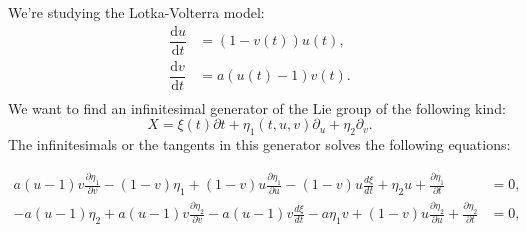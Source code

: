 \documentclass{article}
\begin{document}
We're studying the Lotka-Volterra model:
\begin{align*}
\dfrac{\mathrm{d}u}{\mathrm{d}t}&=\left(1 - v{\left(t \right)}\right) u{\left(t \right)},\\
\dfrac{\mathrm{d}v}{\mathrm{d}t}&=a \left(u{\left(t \right)} - 1\right) v{\left(t \right)}.\\
\end{align*}
We want to find an infinitesimal generator of the Lie group of the following kind:
$$X=\xi(t)\partial t+\eta_{1}(t,u,v)\partial_u+\eta_{2}\partial_v.$$
The infinitesimals or the tangents in this generator solves the following equations:

\begin{align*}
a \left(u - 1\right) v \frac{\partial\eta_{1}}{\partial v} - \left(1 - v\right) \eta_{1} + \left(1 - v\right) u \frac{\partial\eta_{1}}{\partial u} - \left(1 - v\right) u \frac{d\xi}{dt} + \eta_{2} u + \frac{\partial\eta_1}{\partial t}&=0,\\
- a \left(u - 1\right) \eta_{2} + a \left(u - 1\right) v \frac{\partial\eta_{2}}{\partial v} - a \left(u - 1\right) v \frac{d\xi}{dt} - a \eta_{1} v + \left(1 - v\right) u \frac{\partial\eta_{2}}{\partial u} + \frac{\partial\eta_2}{\partial t}&=0,\\
\end{align*}
\end{document}
